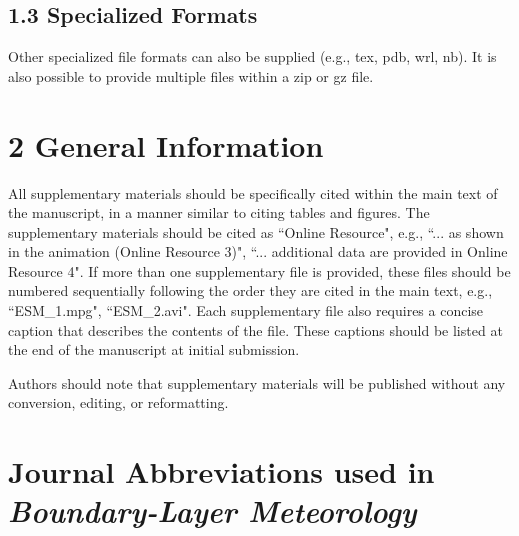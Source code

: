 \subsection*{1.3 Specialized Formats}
Other specialized file formats can also be supplied (e.g., tex, pdb, wrl, nb). It is also possible to provide multiple files within a zip or gz file.

\section*{2 General Information}
All supplementary materials should be specifically cited within the main text of the manuscript, in a manner similar to citing tables and figures. The supplementary materials should be cited as ``Online Resource", e.g., ``... as shown in the animation (Online Resource 3)", ``... additional data are provided in Online Resource 4". If more than one supplementary file is provided, these files should be numbered sequentially following the order they are cited in the main text, e.g., ``ESM\_1.mpg", ``ESM\_2.avi". Each supplementary file also requires a concise caption that describes the contents of the file. These captions should be listed at the end of the manuscript at initial submission.

Authors should note that supplementary materials will be published without any conversion, editing, or reformatting. 
\clearpage

\section*{Journal Abbreviations used in \textit{Boundary-Layer Meteorology}}



